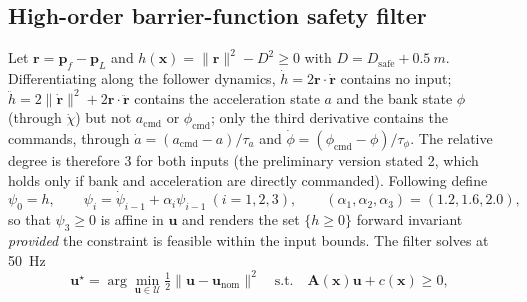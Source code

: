 \subsection{High-order barrier-function safety filter}\label{sec:hocbf}
Let $\mathbf r=\mathbf p_f-\mathbf p_L$ and $h(\mathbf x)=\|\mathbf r\|^2-D^2\ge0$ with $D=D_{\mathrm{safe}}+\SI{0.5}{m}$. Differentiating along the follower dynamics, $\dot h=2\mathbf r\cdot\dot{\mathbf r}$ contains no input; $\ddot h=2\|\dot{\mathbf r}\|^2+2\mathbf r\cdot\ddot{\mathbf r}$ contains the acceleration state $a$ and the bank state $\phi$ (through $\dot\chi$) but not $a_{\mathrm{cmd}}$ or $\phi_{\mathrm{cmd}}$; only the third derivative contains the commands, through $\dot a=(a_{\mathrm{cmd}}-a)/\tau_a$ and $\dot\phi=(\phi_{\mathrm{cmd}}-\phi)/\tau_\phi$. The relative degree is therefore $3$ for both inputs (the preliminary version stated 2, which holds only if bank and acceleration are directly commanded). Following \cite{xiao2022} define
\begin{equation}
\psi_0=h,\qquad \psi_i=\dot\psi_{i-1}+\alpha_i\psi_{i-1}\ (i=1,2,3),\qquad (\alpha_1,\alpha_2,\alpha_3)=(1.2,1.6,2.0),
\end{equation}
so that $\psi_3\ge0$ is affine in $\mathbf u$ and renders the set $\{h\ge0\}$ forward invariant \emph{provided} the constraint is feasible within the input bounds. The filter solves at \SI{50}{Hz}
\begin{equation}
\mathbf u^\star=\arg\min_{\mathbf u\in\mathcal U}\tfrac12\|\mathbf u-\mathbf u_{\mathrm{nom}}\|^2\quad\text{s.t.}\quad \mathbf A(\mathbf x)\mathbf u+c(\mathbf x)\ge0,
\end{equation}
